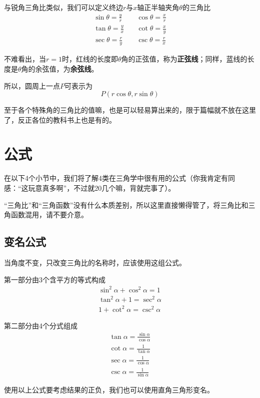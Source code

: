 与锐角三角比类似，我们可以定义终边$r$与$x$轴正半轴夹角$\theta$的三角比
\begin{align*}
    \sin\theta=\frac{y}{r}\quad & \cos\theta=\frac{x}{r} \\
    \tan\theta=\frac{y}{x}\quad & \cot\theta=\frac{x}{y} \\
    \sec\theta=\frac{r}{y}\quad & \csc\theta=\frac{r}{x}
\end{align*}

不难看出，当$r=1$时，红线的长度即$\theta$角的正弦值，称为\textbf{正弦线}；同样，蓝线的长度是$\theta$角的余弦值，为\textbf{余弦线}。

所以，圆周上一点$P$可表示为\[P(r\cos\theta,r\sin\theta)\]

至于各个特殊角的三角比的值嘛，也是可以轻易算出来的，限于篇幅就不放在这里了，反正各位的教科书上也是有的。

\section{公式}
在以下4个小节中，我们将了解4类在三角学中很有用的公式（你我肯定有同感：“这玩意真多啊”，不过就20几个嘛，背就完事了）。

“三角比”和“三角函数”没有什么本质差别，所以这里直接懒得管了，将三角比和三角函数混用，请不要介意。

\subsection{变名公式}
当角度不变，只改变三角比的名称时，应该使用这组公式。

第一部分由3个含平方的等式构成
\begin{gather}
	\sin^2\alpha+\cos^2\alpha=1 \label{equ:trig-1} \\
	\tan^2\alpha+1=\sec^2\alpha \label{equ:trig-2}\\
	1+\cot^2\alpha=\csc^2\alpha \label{equ:trig-3}
\end{gather}

第二部分由4个分式组成
\begin{gather}
	\tan\alpha=\frac{\sin\alpha}{\cos\alpha} \label{equ:trig-4} \\
	\cot\alpha=\frac{1}{\tan\alpha} \label{equ:trig-5} \\
	\sec\alpha=\frac{1}{\cos\alpha} \label{equ:trig-6} \\
	\csc\alpha=\frac{1}{\sin\alpha} \label{equ:trig-7}
\end{gather}

使用以上公式要考虑结果的正负，我们也可以使用直角三角形变名。

